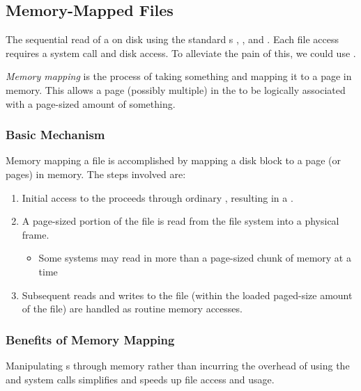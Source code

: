 \subsection{Memory-Mapped Files}\label{subsec:Memory_Mapped_Files}
The sequential read of a  on disk using the standard s , , and .
Each file access requires a system call and disk access.
To alleviate the pain of this, we could use .

\begin{definition}\label{def:Memory_Mapping}
  \emph{Memory mapping} is the process of taking something and mapping it to a page in memory.
  This allows a page (possibly multiple) in the  to be logically associated with a page-sized amount of something.
\end{definition}

\subsubsection{Basic Mechanism}\label{subsubsec:Basic_Memory_Mapping_Mechanism}
Memory mapping a file is accomplished by mapping a disk block to a page (or
pages) in memory.
The steps involved are:
\begin{enumerate}[noitemsep]
\item Initial access to the  proceeds through ordinary , resulting in a .
\item A page-sized portion of the file is read from the file system into a physical frame.
  \begin{itemize}[noitemsep]
  \item Some systems may read in more than a page-sized chunk of memory at a time
  \end{itemize}
\item Subsequent reads and writes to the file (within the loaded paged-size amount of the file) are handled as routine memory accesses.
\end{enumerate}

\subsubsection{Benefits of Memory Mapping}\label{subsubsec:Memory_Mapping_Benefits}
Manipulating s through memory rather than incurring the overhead of using the  and  system calls simplifies and speeds up file access and usage.

